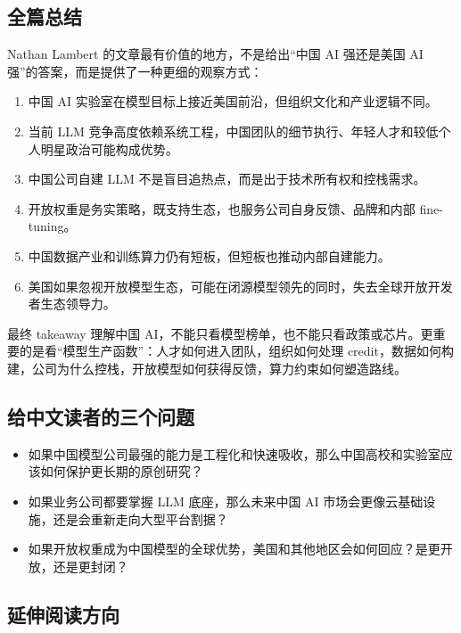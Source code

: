 \documentclass[a4paper]{article}
\begin{document}
\subsection{全篇总结}

Nathan Lambert 的文章最有价值的地方，不是给出``中国 AI 强还是美国 AI 强''的答案，而是提供了一种更细的观察方式：

\begin{enumerate}[leftmargin=1.5em]
    \item 中国 AI 实验室在模型目标上接近美国前沿，但组织文化和产业逻辑不同。
    \item 当前 LLM 竞争高度依赖系统工程，中国团队的细节执行、年轻人才和较低个人明星政治可能构成优势。
    \item 中国公司自建 LLM 不是盲目追热点，而是出于技术所有权和控栈需求。
    \item 开放权重是务实策略，既支持生态，也服务公司自身反馈、品牌和内部 fine-tuning。
    \item 中国数据产业和训练算力仍有短板，但短板也推动内部自建能力。
    \item 美国如果忽视开放模型生态，可能在闭源模型领先的同时，失去全球开放开发者生态领导力。
\end{enumerate}

\begin{importantbox}{最终 takeaway}
理解中国 AI，不能只看模型榜单，也不能只看政策或芯片。更重要的是看``模型生产函数''：人才如何进入团队，组织如何处理 credit，数据如何构建，公司为什么控栈，开放模型如何获得反馈，算力约束如何塑造路线。
\end{importantbox}

\subsection{给中文读者的三个问题}

\begin{itemize}[leftmargin=1.5em]
    \item 如果中国模型公司最强的能力是工程化和快速吸收，那么中国高校和实验室应该如何保护更长期的原创研究？
    \item 如果业务公司都要掌握 LLM 底座，那么未来中国 AI 市场会更像云基础设施，还是会重新走向大型平台割据？
    \item 如果开放权重成为中国模型的全球优势，美国和其他地区会如何回应？是更开放，还是更封闭？
\end{itemize}

\subsection{延伸阅读方向}
\end{document}
